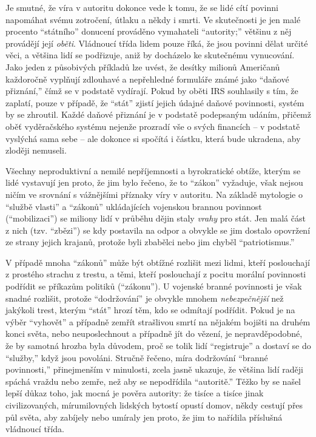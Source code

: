 \documentclass{book}
\begin{document}
Je smutné, že víra v autoritu dokonce vede k tomu, že se lidé cítí povinni napomáhat svému zotročení, útlaku a někdy i smrti. Ve skutečnosti je jen malé procento \enquote{státního} donucení prováděno vymahateli \enquote{autority;} většinu z něj provádějí její \emph{oběti}. Vládnoucí třída lidem pouze říká, že jsou povinni dělat určité věci, a většina lidí se podřizuje, aniž by docházelo ke skutečnému vynucování. Jako jeden z působivých příkladů lze uvést, že desítky milionů Američanů každoročně vyplňují zdlouhavé a nepřehledné formuláře známé jako \enquote{daňové přiznání,} čímž se v podstatě vydírají. Pokud by oběti IRS souhlasily s tím, že zaplatí, pouze v případě, že \enquote{stát} zjistí jejich údajné daňové povinnosti, systém by se zhroutil. Každé daňové přiznání je v podstatě podepsaným udáním, přičemž oběť vyděračského systému nejenže prozradí vše o svých financích -- v podstatě vyslýchá sama sebe -- ale dokonce si spočítá i částku, která bude ukradena, aby zloději nemuseli.

Všechny neproduktivní a nemilé nepříjemnosti a byrokratické obtíže, kterým se lidé vystavují jen proto, že jim bylo řečeno, že to \enquote{zákon} vyžaduje, však nejsou ničím ve srovnání s vážnějšími příznaky víry v autoritu. Na základě mytologie o \enquote{službě vlasti} a \enquote{zákonů} ukládajících vojenskou brannou povinnost (\enquote{mobilizaci}) se miliony lidí v průběhu dějin staly \emph{vrahy} pro stát. Jen malá část z nich (tzv. \enquote{zbězi}) se kdy postavila na odpor a obvykle se jim dostalo opovržení ze strany jejich krajanů, protože byli zbabělci nebo jim chyběl \enquote{patriotismus.}

V případě mnoha \enquote{zákonů} může být obtížné rozlišit mezi lidmi, kteří poslouchají z prostého strachu z trestu, a těmi, kteří poslouchají z pocitu morální povinnosti podřídit se příkazům politiků (\enquote{zákonu}). U vojenské branné povinnosti je však snadné rozlišit, protože \enquote{dodržování} je obvykle mnohem \emph{nebezpečnější} než jakýkoli trest, kterým \enquote{stát} hrozí těm, kdo se odmítají podřídit. Pokud je na výběr \enquote{vyhovět} a případně zemřít strašlivou smrtí na nějakém bojišti na druhém konci světa, nebo neuposlechnout a případně jít do vězení, je nepravděpodobné, že by samotná hrozba byla důvodem, proč se tolik lidí \enquote{registruje} a dostaví se do \enquote{služby,} když jsou povoláni. Stručně řečeno, míra dodržování \enquote{branné povinnosti,} přinejmenším v minulosti, zcela jasně ukazuje, že většina lidí raději spáchá vraždu nebo zemře, než aby se nepodřídila \enquote{autoritě.} Těžko by se našel lepší důkaz toho, jak mocná je pověra autority: že tisíce a tisíce jinak civilizovaných, mírumilovných lidských bytostí opustí domov, někdy cestují přes půl světa, aby zabíjely nebo umíraly jen proto, že jim to nařídila příslušná vládnoucí třída.
\end{document}
